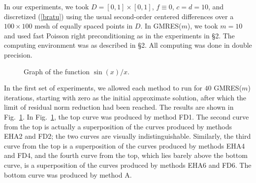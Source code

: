 \documentclass{svk_en}
\begin{document}
\def\gmres{{GMRES}} 
\def\gmresm{{\rm GMRES($m$)}} 

In our experiments, we took $D = [0,1]\times[0,1]$, $f \equiv0$, 
$c=d=10$, and discretized (\ref{bratu}) using the usual second-order 
centered differences over a $100\times100$ mesh of equally 
spaced points in $D$. In \gmres($m$), we took $m=10$ and used fast  
Poisson right preconditioning as in the experiments in \S2. The computing  
environment was as described in \S2. All computing was done  
in double precision.  
 
\begin{figure}

\caption{Graph of the function $\sin(x)/x$.} 
\label{diff} 
\end{figure}  
 
In the first set of experiments, we allowed each method to  
run for $40$ {\gmresm} iterations, starting with zero as the initial  
approximate solution, after which the limit of residual norm  
reduction had been reached. The results are shown in Fig.~\ref{diff}.  
In Fig.~\ref{diff}, the top curve was produced by method FD1. 
The second curve from the top is actually a superposition of  
the curves produced by methods EHA2 and FD2; the two curves are 
visually indistinguishable. Similarly, the third curve from  
the top is a superposition of the curves produced by methods EHA4 
and FD4, and the fourth curve from the top, which lies barely above  
the bottom curve, is a superposition of the curves produced by  
methods EHA6 and FD6. The bottom curve was produced by method A. 
 
\end{document}
